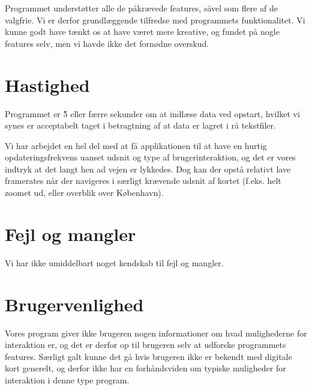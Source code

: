 Programmet understøtter alle de påkrævede features, såvel som flere af de valgfrie. Vi er derfor grundlæggende tilfredse med programmets funktionalitet. Vi kunne godt have tænkt os at have været mere kreative, og fundet på nogle features selv, men vi havde ikke det fornødne overskud.

\section{Hastighed}

Programmet er \~5 eller færre sekunder om at indlæse data ved opstart, hvilket vi synes er acceptabelt taget i betragtning af at data er lagret i rå tekstfiler.

Vi har arbejdet en hel del med at få applikationen til at have en hurtig opdateringsfrekvens uanset udsnit og type af brugerinteraktion, og det er vores indtryk at det langt hen ad vejen er lykkedes. Dog kan der opstå relativt lave framerates når der navigeres i særligt krævende udsnit af kortet (f.eks. helt zoomet ud, eller overblik over København).

\section{Fejl og mangler}

Vi har ikke umiddelbart noget kendskab til fejl og mangler.

\section{Brugervenlighed}

Vores program giver ikke brugeren nogen informationer om hvad mulighederne for interaktion er, og det er derfor op til brugeren selv at udforske programmets features. Særligt galt kunne det gå hvis brugeren ikke er bekendt med digitale kort generelt, og derfor ikke har en forhåndsviden om typiske muligheder for interaktion i denne type program.
